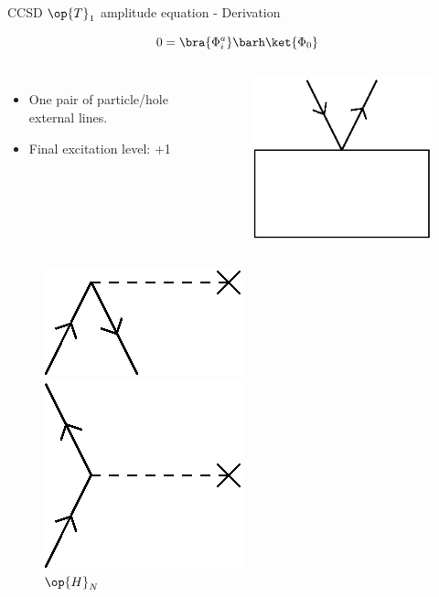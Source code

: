 \begin{frame}{CCSD $\op{T}_1$ amplitude equation - Derivation }

    \small
    \begin{equation*}
        0 = \bra{\Phi_i^a} \barh \ket{\Phi_0}
    \end{equation*}
    \begin{columns}
    \begin{itemize}
        \item One pair of particle/hole  external lines.
        \item Final excitation level: +1
    \end{itemize}
    \begin{figure}
        \centering
        \includegraphics[scale=0.45]{graphics/t1amp_diag}
    \end{figure}
    \end{columns}
    \renewcommand{\figurename}{Elements}
    \begin{columns}[t]
    \begin{figure}
        \caption{$\op{H}_N$}
        \centering
        \parbox{0.20\textwidth}{
            \centering
            \includegraphics[scale=0.35]{graphics/f1}} 
        \parbox{0.20\textwidth}{
            \centering
            \includegraphics[scale=0.35]{graphics/f2}} 

\end{figure}
\end{columns}
\end{frame}
